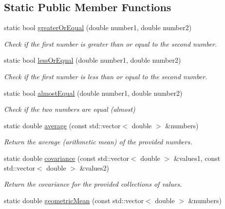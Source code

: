 \subsection*{\-Static \-Public \-Member \-Functions}
\begin{DoxyCompactItemize}
\item 
static bool \hyperlink{classmultiscale_1_1Numeric_a13ae1e2b35654937bed4c19e776ccdb5}{greater\-Or\-Equal} (double number1, double number2)
\begin{DoxyCompactList}\small\item\em \-Check if the first number is greater than or equal to the second number. \end{DoxyCompactList}\item 
static bool \hyperlink{classmultiscale_1_1Numeric_a7f21159a23c71c1d37e1c487e9ff815c}{less\-Or\-Equal} (double number1, double number2)
\begin{DoxyCompactList}\small\item\em \-Check if the first number is less than or equal to the second number. \end{DoxyCompactList}\item 
static bool \hyperlink{classmultiscale_1_1Numeric_a996dda9f7361be59b4614eace0b93f24}{almost\-Equal} (double number1, double number2)
\begin{DoxyCompactList}\small\item\em \-Check if the two numbers are equal (almost) \end{DoxyCompactList}\item 
static double \hyperlink{classmultiscale_1_1Numeric_a35c4c545f6ef78c31c94a85b9f070ee5}{average} (const std\-::vector$<$ double $>$ \&numbers)
\begin{DoxyCompactList}\small\item\em \-Return the average (arithmetic mean) of the provided numbers. \end{DoxyCompactList}\item 
static double \hyperlink{classmultiscale_1_1Numeric_a574e8c0824ad8e441898e4857816585a}{covariance} (const std\-::vector$<$ double $>$ \&values1, const std\-::vector$<$ double $>$ \&values2)
\begin{DoxyCompactList}\small\item\em \-Return the covariance for the provided collections of values. \end{DoxyCompactList}\item 
static double \hyperlink{classmultiscale_1_1Numeric_a53023741b672ebb4790bc2e89dbe1ee9}{geometric\-Mean} (const std\-::vector$<$ double $>$ \&numbers)

\end{DoxyCompactItemize}
